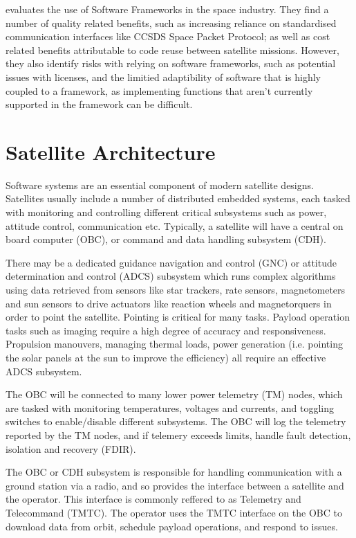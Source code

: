 \documentclass[../report.tex]{subfiles}
\begin{document}
\citet{Farges_2022} evaluates the use of Software Frameworks in the space
industry. They find a number of quality related benefits, such as increasing
reliance on standardised communication interfaces like CCSDS Space Packet
Protocol; as well as cost related benefits attributable to code reuse between
satellite missions. However, they also identify risks with relying on software
frameworks, such as potential issues with licenses, and the limitied
adaptibility of software that is highly coupled to a framework, as implementing
functions that aren't currently supported in the framework can be difficult.


\section{Satellite Architecture}

Software systems are an essential component of modern satellite designs.
Satellites usually include a number of distributed embedded systems, each
tasked with monitoring and controlling different critical subsystems such as
power, attitude control, communication etc. Typically, a satellite will have a
central on board computer (OBC), or command and data handling subsystem (CDH).

There may be a dedicated guidance navigation and control (GNC) or attitude
determination and control (ADCS) subsystem which runs complex algorithms using
data retrieved from sensors like star trackers, rate sensors, magnetometers and
sun sensors to drive actuators like reaction wheels and magnetorquers in order
to point the satellite. Pointing is critical for many tasks. Payload operation
tasks such as imaging require a high degree of accuracy and responsiveness.
Propulsion manouvers, managing thermal loads, power generation (i.e. pointing
the solar panels at the sun to improve the efficiency) all require an effective
ADCS subsystem.

The OBC will be connected to many lower power telemetry (TM) nodes, which are
tasked with monitoring temperatures, voltages and currents, and toggling switches
to enable/disable different subsystems. The OBC will log the telemetry reported
by the TM nodes, and if telemery exceeds limits, handle fault detection,
isolation and recovery (FDIR).

The OBC or CDH subsystem is responsible for handling communication with a
ground station via a radio, and so provides the interface between a satellite
and the operator. This interface is commonly reffered to as Telemetry and
Telecommand (TMTC). The operator uses the TMTC interface on the OBC to download data
from orbit, schedule payload operations, and respond to issues.
\end{document}
